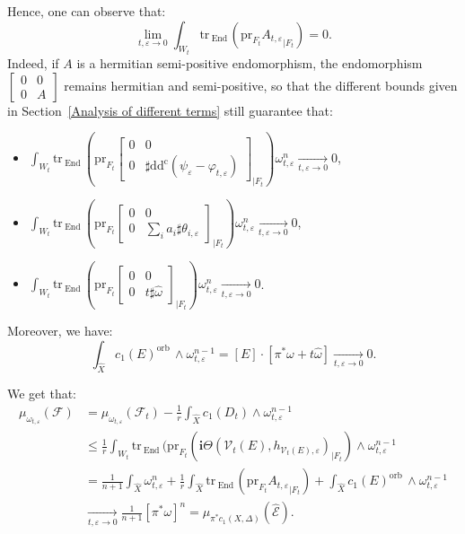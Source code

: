 \documentclass[12pt,a4paper]{amsart}
\newcommand{\orb}{\mathrm{orb}\,}
\newcommand{\End}{\mathrm{End}\,}
\newcommand{\ddc}{\mathrm{dd^c}}
\newcommand{\tr}{\mathrm{tr}\,}
\theoremstyle{plain}
\theoremstyle{definition}
\begin{document}
Hence, one can observe that:
$$
\lim_{t, \varepsilon \rightarrow 0} \int_{W_t} \tr_{\End} \left( \mathrm{pr}_{F_t} {A_{t, \varepsilon}}_{|F_t} \right) = 0.
$$
Indeed, if $A$ is a hermitian semi-positive endomorphism, the endomorphism
$
\begin{bmatrix}
    0 & 0 \\
    0 & A
\end{bmatrix}
$
remains hermitian and semi-positive, so that the different bounds given in Section~\ref{Analysis of different terms} still guarantee that:
\begin{itemize}
    \item $\displaystyle \int_{W_t} \tr_\End \left( \mathrm{pr}_{F_t}
    \begin{bmatrix}
    0 & 0 \\
    0 & \sharp \ddc (\psi_\varepsilon - \varphi_{t, \varepsilon})
\end{bmatrix}_{|F_t}
\right) \omega_{t, \varepsilon}^n \underset{t, \varepsilon \to 0}{\longrightarrow} 0$,
    \item $\displaystyle \int_{W_t} \tr_\End \left( \mathrm{pr}_{F_t}
    \begin{bmatrix}
    0 & 0 \\
    0 & \sum_i a_i \sharp \theta_{i, \varepsilon}
\end{bmatrix}_{|F_t}
\right) \omega_{t, \varepsilon}^n \underset{t, \varepsilon \to 0}{\longrightarrow} 0$,
    \item $\displaystyle \int_{W_t} \tr_\End \left( \mathrm{pr}_{F_t}
    \begin{bmatrix}
    0 & 0 \\
    0 & t \sharp \widehat{\omega}
\end{bmatrix}_{|F_t}
\right) \omega_{t, \varepsilon}^n \underset{t, \varepsilon \to 0}{\longrightarrow} 0$.
\end{itemize}

Moreover, we have:
$$
\int_{\widehat{X}} c_1(E)^\orb \wedge \omega_{t, \varepsilon}^{n-1} = \left[ E \right] \cdot \left[ \pi^* \omega + t\widehat{\omega} \right] \underset{t, \varepsilon \to 0}{\longrightarrow} 0.
$$


We get that:
\begin{align*}
    \mu_{\omega_{t, \varepsilon}}(\mathcal{F}) & = \mu_{\omega_{t, \varepsilon}}(\mathcal{F}_t) - \frac{1}{r}\int_{\widehat{X}} c_1(D_t) \wedge \omega_{t, \varepsilon}^{n-1} \\
    & \leq \frac{1}{r} \int_{W_t} \tr_\End( \mathrm{pr}_{F_t}(\textbf{i}\Theta(\mathcal{V}_t(E), h_{\mathcal{V}_t(E), \varepsilon})_{|F_t}) \wedge \omega_{t, \varepsilon}^{n-1} \\
    & = \frac{1}{n+1} \int_{\widehat{X}}\omega_{t, \varepsilon}^n + \frac{1}{r} \int_{\widehat{X}} \tr_{\End} \left( \mathrm{pr}_{F_t} {A_{t, \varepsilon}}_{|F_t} \right) + \int_{\widehat{X}} c_1(E)^\orb \wedge \omega_{t, \varepsilon}^{n-1} \\
    & \underset{t, \varepsilon \longrightarrow 0}{\longrightarrow} \frac{1}{n+1} \left[ \pi^* \omega \right]^n = \mu_{\pi^*c_1(X, \Delta)}(\widehat{\mathcal{E}}).
\end{align*}
\end{document}
